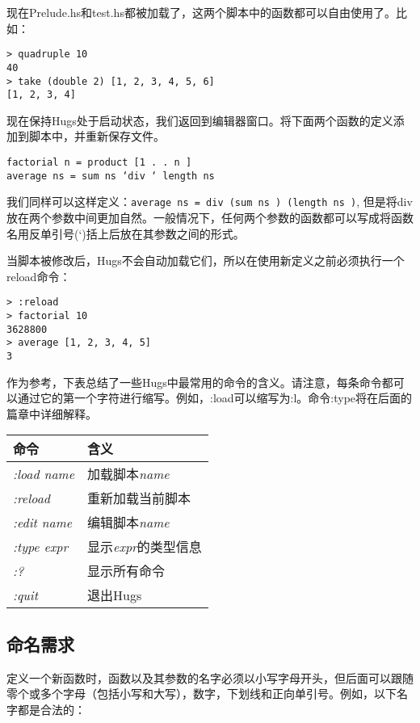 现在Prelude.hs和test.hs都被加载了，这两个脚本中的函数都可以自由使用了。比如：

\begin{verbatim}
> quadruple 10
40
> take (double 2) [1, 2, 3, 4, 5, 6]
[1, 2, 3, 4]
\end{verbatim}

现在保持Hugs处于启动状态，我们返回到编辑器窗口。将下面两个函数的定义添加到脚本中，并重新保存文件。

\begin{verbatim}
factorial n = product [1 . . n ]
average ns = sum ns ‘div ‘ length ns
\end{verbatim}

我们同样可以这样定义：\verb|average ns = div (sum ns ) (length ns )|,
但是将div放在两个参数中间更加自然。一般情况下，任何两个参数的函数都可以写成将函数名用反单引号(`)括上后放在其参数之间的形式。

当脚本被修改后，Hugs不会自动加载它们，所以在使用新定义之前必须执行一个reload命令：
\begin{verbatim}
> :reload
> factorial 10
3628800
> average [1, 2, 3, 4, 5]
3
\end{verbatim}

作为参考，下表总结了一些Hugs中最常用的命令的含义。请注意，每条命令都可以通过它的第一个字符进行缩写。例如，:load可以缩写为:l。命令:type将在后面的篇章中详细解释。

\begin{table}[htbp]
\label{tab:threesome}
\centering
\begin{tabular}{ll}
\hline
命令 & 含义\\
\hline
\textit{:load name} & 加载脚本\textit{name} \\
\textit{:reload} & 重新加载当前脚本 \\
\textit{:edit name} & 编辑脚本\textit{name} \\
\textit{:type expr} & 显示\textit{expr}的类型信息 \\
\textit{:?} & 显示所有命令 \\
\textit{:quit} & 退出Hugs \\
\hline
\end{tabular}
\end{table}

\subsection{命名需求}
定义一个新函数时，函数以及其参数的名字必须以小写字母开头，但后面可以跟随零个或多个字母（包括小写和大写），数字，下划线和正向单引号。例如，以下名字都是合法的：

